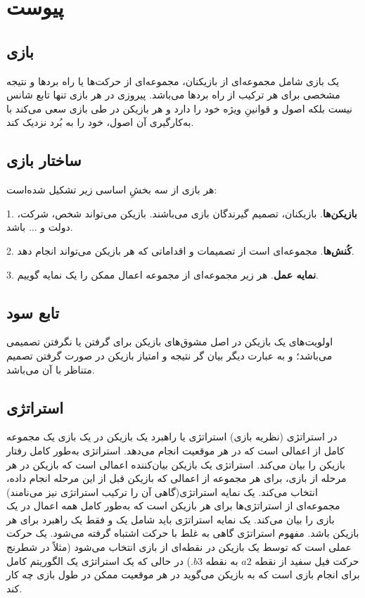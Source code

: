 \documentclass[12pt]{article}
\begin{document}
{{{{{{{{\section{پیوست}
\subsection{بازی}
یک بازی شامل مجموعه‌ای از بازیکنان، مجموعه‌ای از حرکت‌ها یا راه بردها و نتیجه مشخصی برای هر ترکیب از راه بردها می‌باشد. پیروزی در هر بازی تنها تابع شانس نیست بلکه اصول و قوانینِ ویژه خود را دارد و هر بازیکن در طی بازی سعی می‌کند با به‌کارگیری آن اصول، خود را به بُرد نزدیک کند.

\subsection*{ساختار بازی}
هر بازی از سه بخشِ اساسی زیر تشکیل شده‌است:

1. \textbf{بازیکن‌ها}.
بازیکنان، تصمیم گیرندگان بازی می‌باشند. بازیکن می‌تواند شخص، شرکت، دولت و $\dots$  باشد.

2. \textbf{کُنش‌ها}.
مجموعه‌ای است از تصمیمات و اقداماتی که هر بازیکن می‌تواند انجام دهد.


3. \textbf{نمایه عمل}.
هر زیر مجموعه‌ای از مجموعه اعمال ممکن را یک نمایه گوییم.

\subsection{تابع سود}
اولویت‌های یک بازیکن در اصل مشوق‌های بازیکن برای گرفتن یا نگرفتن تصمیمی می‌باشد؛ و به عبارت دیگر بیان گر نتیجه و امتیاز بازیکن در صورت گرفتن تصمیم متناظر با آن می‌باشد.
\subsection{استراتژی}
در استراتژی (نظریه بازی) استراتژی یا راهبرد یک بازیکن در یک بازی یک مجموعه کامل از اعمالی است که در هر موقعیت انجام می‌دهد.
استراتژی به‌طور کامل رفتار بازیکن را بیان می‌کند. استراتژی یک بازیکن بیان‌کننده اعمالی است که بازیکن در هر مرحله از بازی، برای هر مجموعه از اعمالی که بازیکن قبل از این مرحله انجام داده، انتخاب می‌کند.
یک نمایه استراتژی(گاهی آن را ترکیب استراتژی نیز می‌نامند) مجموعه‌ای از استراتژی‌ها برای هر بازیکن است که به‌طور کامل همه اعمال در یک بازی را بیان می‌کند. یک نمایه استراتژی باید شامل یک و فقط یک راهبرد برای هر بازیکن باشد.
مفهوم استراتژی گاهی به غلط با حرکت اشتباه گرفته می‌شود. یک حرکت عملی است که توسط یک بازیکن در نقطه‌ای از بازی انتخاب می‌شود (مثلاً در شطرنج حرکت فیل سفید از نقطه $a2$ به نقطه $b3$.) در حالی که یک استراتژی یک الگوریتم کامل برای انجام بازی است که به بازیکن می‌گوید در هر موقعیت ممکن در طول بازی چه کار کند.

}}}}}}}}
\end{document}
